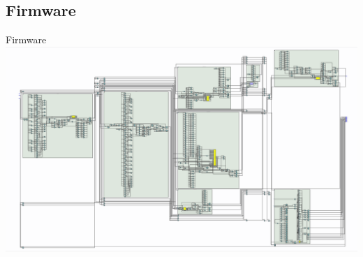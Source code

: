\documentclass{beamer}
\begin{document}
	\subsection{Firmware}
		\begin{frame}{Firmware}
			\includegraphics[width=\paperwidth]{rtl_fake.png}
		\end{frame}
\end{document}
